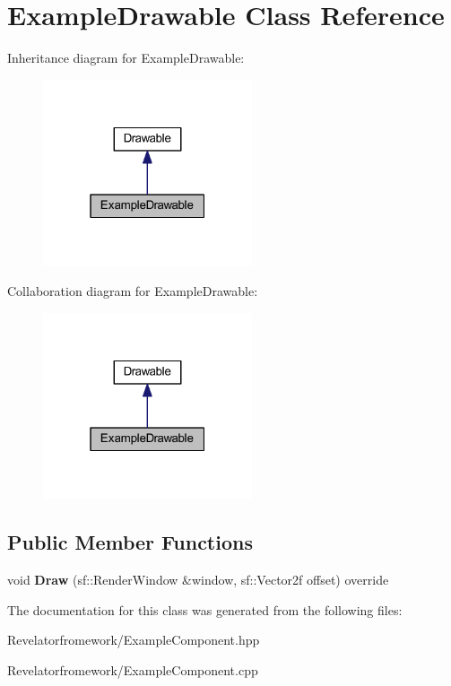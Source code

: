 \hypertarget{class_example_drawable}{\section{Example\-Drawable Class Reference}
\label{class_example_drawable}
}


Inheritance diagram for Example\-Drawable\-:\nopagebreak
\begin{figure}[H]
\begin{center}
\leavevmode
\includegraphics[width=175pt]{class_example_drawable__inherit__graph}
\end{center}
\end{figure}


Collaboration diagram for Example\-Drawable\-:\nopagebreak
\begin{figure}[H]
\begin{center}
\leavevmode
\includegraphics[width=175pt]{class_example_drawable__coll__graph}
\end{center}
\end{figure}
\subsection*{Public Member Functions}
\begin{DoxyCompactItemize}
\item 
\hypertarget{class_example_drawable_a02efe170a267616262e1bac3d65cdf59}{void {\bfseries Draw} (sf\-::\-Render\-Window \&window, sf\-::\-Vector2f offset) override}\label{class_example_drawable_a02efe170a267616262e1bac3d65cdf59}

\end{DoxyCompactItemize}


The documentation for this class was generated from the following files\-:\begin{DoxyCompactItemize}
\item 
Revelatorfromework/Example\-Component.\-hpp\item 
Revelatorfromework/Example\-Component.\-cpp\end{DoxyCompactItemize}
